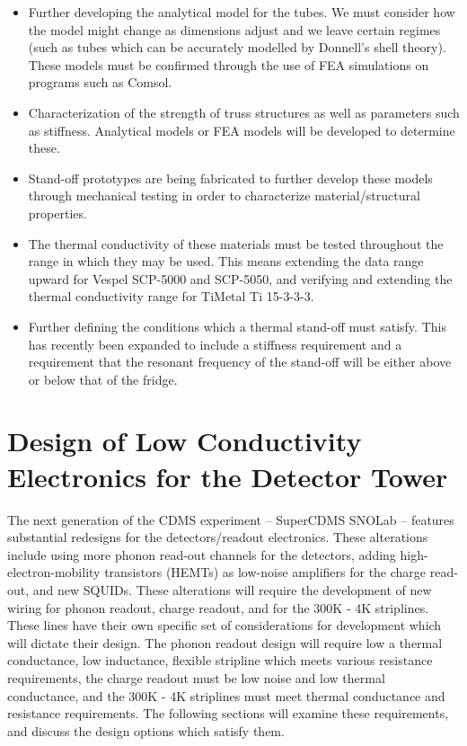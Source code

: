 \documentclass{report}
\begin{document}
\begin{itemize}
\item Further developing the analytical model for the tubes. We must consider how the model might change as dimensions adjust and we leave certain regimes (such as tubes which can be accurately modelled by Donnell's shell theory). These models must be confirmed through the use of FEA simulations on programs such as Comsol.
\item Characterization of the strength of truss structures as well as parameters such as stiffness. Analytical models or FEA models will be developed to determine these.
\item Stand-off prototypes are being fabricated to further develop these models through mechanical testing in order to characterize material/structural properties.
\item The thermal conductivity of these materials must be tested throughout the range in which they may be used. This means extending the data range upward for Vespel SCP-5000 and SCP-5050, and verifying and extending the thermal conductivity range for TiMetal Ti 15-3-3-3.
\item Further defining the conditions which a thermal stand-off must satisfy. This has recently been expanded to include a stiffness requirement and a requirement that the resonant frequency of the stand-off will be either above or below that of the fridge.
\end{itemize}


\chapter{Design of Low Conductivity Electronics for the Detector Tower}

The next generation of the CDMS experiment -- SuperCDMS SNOLab -- features substantial redesigns for the detectors/readout electronics. These alterations include using more phonon read-out channels for the detectors, adding high-electron-mobility transistors (HEMTs) as low-noise amplifiers for the charge read-out, and new SQUIDs. These alterations will require the development of new wiring for phonon readout, charge readout, and for the 300K - 4K striplines. These lines have their own specific set of considerations for development which will dictate their design. The phonon readout design will require low a thermal conductance, low inductance, flexible stripline which meets various resistance requirements, the charge readout must be low noise and low thermal conductance, and the 300K - 4K striplines must meet thermal conductance and resistance requirements. The following sections will examine these requirements, and discuss the design options which satisfy them.
\end{document}
